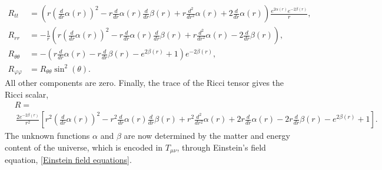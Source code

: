 \begin{align}
    R_{tt}
    & =
    \left(r \left(\frac{d}{d r} \alpha{\left(r \right)}\right)^{2} - r \frac{d}{d r} \alpha{\left(r \right)} \frac{d}{d r} \beta{\left(r \right)} + r \frac{d^{2}}{d r^{2}} \alpha{\left(r \right)} + 2 \frac{d}{d r} \alpha{\left(r \right)}
        \right)
    \frac{
         e^{2 \alpha{\left(r \right)}} e^{- 2 \beta{\left(r \right)}}}{r}, \\
    R_{rr}
    & =
    - \frac{1}{r}
    \left(
        r \left(\frac{d}{d r} \alpha{\left(r \right)}\right)^{2} - r \frac{d}{d r} \alpha{\left(r \right)} \frac{d}{d r} \beta{\left(r \right)} + r \frac{d^{2}}{d r^{2}} \alpha{\left(r \right)} - 2 \frac{d}{d r} \beta{\left(r \right)} 
    \right),\\
    R_{\theta \theta}
    &=
    - \left(r \frac{d}{d r} \alpha{\left(r \right)} - r \frac{d}{d r} \beta{\left(r \right)} - e^{2 \beta{\left(r \right)}} + 1\right) e^{- 2 \beta{\left(r \right)}}, \\
    R_{\varphi \varphi} & = R_{\theta \theta} \sin^2( \theta).
\end{align}
%
All other components are zero.
Finally, the trace of the Ricci tensor gives the Ricci scalar,
%
\begin{align}
    \nonumber
    &R = \\
    &\, \frac{2 e^{- 2 \beta{\left(r \right)}}}{r^{2}}
    \left[
             r^{2} \left(\frac{d}{d r} \alpha{\left(r \right)}\right)^{2} - r^{2} \frac{d}{d r} \alpha{\left(r \right)} \frac{d}{d r} \beta{\left(r \right)} + r^{2} \frac{d^{2}}{d r^{2}} \alpha{\left(r \right)} + 2 r \frac{d}{d r} \alpha{\left(r \right)} - 2 r \frac{d}{d r} \beta{\left(r \right)} - e^{2 \beta{\left(r \right)}} + 1
    \right].
\end{align}
%
 The unknown functions $\alpha$ and $\beta$ are now determined by the matter and energy content of the universe, which is encoded in $T_{\mu \nu}$, through Einstein's field equation, \autoref{Einstein field equations}.
 

